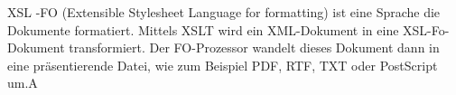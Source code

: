 XSL -FO (Extensible Stylesheet Language for formatting) ist eine Sprache die Dokumente formatiert. Mittels XSLT wird ein XML-Dokument in eine XSL-Fo-Dokument transformiert. Der FO-Prozessor wandelt dieses Dokument dann in eine präsentierende Datei, wie zum Beispiel PDF, RTF, TXT oder PostScript um.A

